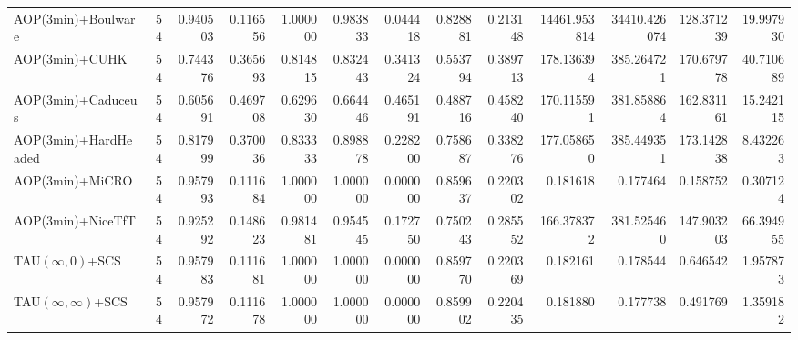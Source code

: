 \begin{tabular}{lrr|r|rr|rr|rr|rrr}
       AOP(3min)+Boulware &      54 & 0.940503 & 0.116556 & 1.000000 &      0.983833 & 0.044418 &      0.828881 & 0.213148 & 14461.953814 & 34410.426074 &  128.371239 &    19.997930 \\
           AOP(3min)+CUHK &      54 & 0.744376 & 0.365693 & 0.814815 &      0.832443 & 0.341324 &      0.553794 & 0.389713 &   178.136394 &   385.264721 &  170.679778 &    40.710689 \\
       AOP(3min)+Caduceus &      54 & 0.605691 & 0.469708 & 0.629630 &      0.664446 & 0.465191 &      0.488716 & 0.458240 &   170.115591 &   381.858864 &  162.831161 &    15.242115 \\
     AOP(3min)+HardHeaded &      54 & 0.817999 & 0.370036 & 0.833333 &      0.898878 & 0.228200 &      0.758687 & 0.338276 &   177.058650 &   385.449351 &  173.142838 &     8.432263 \\
          AOP(3min)+MiCRO &      54 & 0.957993 & 0.111684 & 1.000000 &      1.000000 & 0.000000 &      0.859637 & 0.220302 &     0.181618 &     0.177464 &    0.158752 &     0.307124 \\
        AOP(3min)+NiceTfT &      54 & 0.925292 & 0.148623 & 0.981481 &      0.954545 & 0.172750 &      0.750243 & 0.285552 &   166.378372 &   381.525460 &  147.903203 &    66.394955 \\
     TAU$(\infty, 0)$+SCS &      54 & 0.957983 & 0.111681 & 1.000000 &      1.000000 & 0.000000 &      0.859770 & 0.220369 &     0.182161 &     0.178544 &    0.646542 &     1.957873 \\
TAU$(\infty, \infty)$+SCS &      54 & 0.957972 & 0.111678 & 1.000000 &      1.000000 & 0.000000 &      0.859902 & 0.220435 &     0.181880 &     0.177738 &    0.491769 &     1.359182 \\
\bottomrule
\end{tabular}
